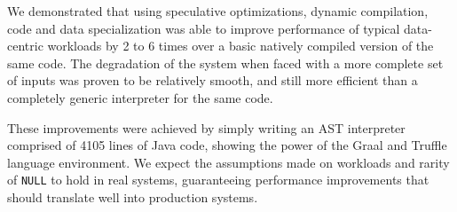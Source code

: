 \documentclass[twoside,11pt,a4paper]{article}
\newcommand{\pls}[1]{\small\texttt{#1}\normalsize}
\newcommand{\plsnull}{\pls{NULL}}
\begin{document}
We demonstrated that using speculative optimizations, dynamic compilation, code and data specialization was able to improve performance of typical data-centric workloads by 2 to 6 times over a basic natively compiled version of the same code. The degradation of the system when faced with a more complete set of inputs was proven to be relatively smooth, and still more efficient than a completely generic interpreter for the same code.

These improvements were achieved by simply writing an AST interpreter comprised of 4105 lines of Java code, showing the power of the Graal and Truffle language environment. We expect the assumptions made on workloads and rarity of \plsnull{} to hold in real systems, guaranteeing performance improvements that should translate well into production systems.
\end{document}
